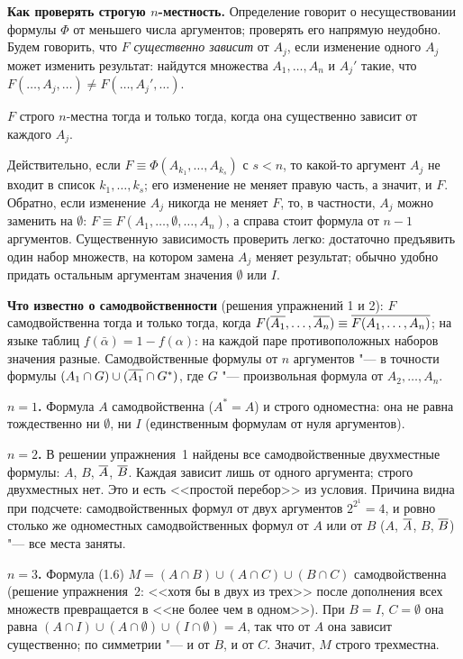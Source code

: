 \begin{solution}[4 (\S\,3)]
\textbf{Как проверять строгую $n$-местность.} Определение говорит о
несуществовании формулы $\Phi$ от меньшего числа аргументов; проверять его
напрямую неудобно. Будем говорить, что $F$ \emph{существенно зависит} от
$A_j$, если изменение одного $A_j$ может изменить результат: найдутся
множества $A_1,\dots,A_n$ и $A_j'$ такие, что
$F(\dots,A_j,\dots)\ne F(\dots,A_j',\dots)$.
\begin{keystmt}
$F$ строго $n$-местна тогда и только тогда, когда она существенно
зависит от каждого $A_j$.
\end{keystmt}
Действительно, если $F\equiv\Phi(A_{k_1},\dots,A_{k_s})$ с $s<n$, то
какой-то аргумент $A_j$ не входит в список $k_1,\dots,k_s$; его изменение
не меняет правую часть, а значит, и $F$. Обратно, если изменение $A_j$
никогда не меняет $F$, то, в частности, $A_j$ можно заменить на $\emptyset$:
$F\equiv F(A_1,\dots,\emptyset,\dots,A_n)$, а справа стоит формула от $n-1$
аргументов. Существенную зависимость проверить легко: достаточно
предъявить один набор множеств, на котором замена $A_j$ меняет результат;
обычно удобно придать остальным аргументам значения $\emptyset$ или $I$.

\textbf{Что известно о самодвойственности} (решения упражнений 1 и 2):
$F$ самодвойственна тогда и только тогда, когда
$F(\overline{A_1},\dots,\overline{A_n})\equiv\overline{F(A_1,\dots,A_n)}$; на языке таблиц
$f(\bar\alpha)=1-f(\alpha)$: на каждой паре противоположных наборов
значения разные. Самодвойственные формулы от $n$ аргументов "--- в точности
формулы $(A_1\cap G)\cup(\overline{A_1}\cap G^*)$, где $G$ "--- произвольная
формула от $A_2,\dots,A_n$.

\textbf{$n=1$.} Формула $A$ самодвойственна ($A^*=A$) и строго
одноместна: она не равна тождественно ни $\emptyset$, ни $I$ (единственным
формулам от нуля аргументов).

\textbf{$n=2$.} В решении упражнения~1 найдены все самодвойственные
двухместные формулы: $A$, $B$, $\overline{A}$, $\overline{B}$. Каждая зависит лишь от
одного аргумента; строго двухместных нет. Это и есть <<простой перебор>>
из условия. Причина видна при подсчете: самодвойственных формул от двух
аргументов $2^{2^1}=4$, и ровно столько же одноместных самодвойственных
формул от $A$ или от $B$ ($A$, $\overline{A}$, $B$, $\overline{B}$) "--- все места
заняты.

\textbf{$n=3$.} Формула (1.6) $M=(A\cap B)\cup(A\cap C)\cup(B\cap C)$
самодвойственна (решение упражнения~2: <<хотя бы в двух из трех>> после
дополнения всех множеств превращается в <<не более чем в одном>>). При
$B=I$, $C=\emptyset$ она равна $(A\cap I)\cup(A\cap\emptyset)\cup
(I\cap\emptyset)=A$, так что от $A$ она зависит существенно; по
симметрии "--- и от $B$, и от $C$. Значит, $M$ строго трехместна.


\end{solution}
